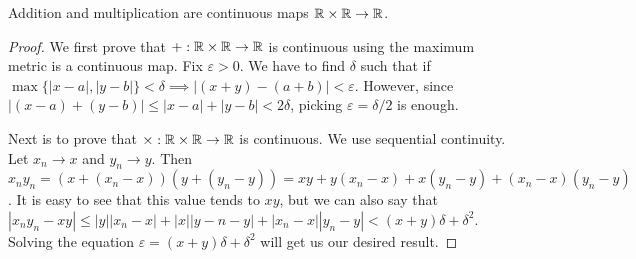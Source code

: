 \documentclass[11pt]{scrreport}
\begin{document}
\begin{proposition}
    Addition and multiplication are continuous maps $\mathbb R\times\mathbb R\to\mathbb R$.
\end{proposition}
\begin{proof}
    We first prove that $+:\mathbb R\times\mathbb R\to\mathbb R$ is continuous using the maximum metric is a continuous map. Fix $\varepsilon>0$. We have to find $\delta$ such that if $\max\{|x-a|,|y-b|\}<\delta \implies |(x+y)-(a+b)|<\varepsilon$. However, since $|(x-a)+(y-b)|\leq|x-a|+|y-b|<2\delta$, picking $\varepsilon = \delta/2$ is enough.

    Next is to prove that $\times:\mathbb R\times\mathbb R\to\mathbb R$ is continuous. We use sequential continuity. Let $x_n\to x$ and $y_n\to y$. Then $x_ny_n=(x+(x_n-x))(y+(y_n-y))=xy+y(x_n-x)+x(y_n-y)+(x_n-x)(y_n-y)$. It is easy to see that this value tends to $xy$, but we can also say that $|x_ny_n-xy|\leq|y||x_n-x|+|x||y-n-y|+|x_n-x||y_n-y|<(x+y)\delta + \delta^2$. Solving the equation $\varepsilon = (x+y)\delta + \delta^2$ will get us our desired result.
\end{proof}
\end{document}
